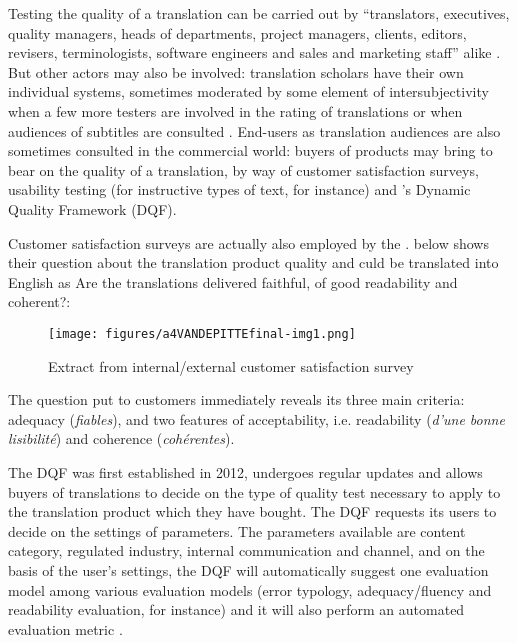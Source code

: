 \documentclass[output=paper]{langsci/langscibook}
\begin{document}
Testing the quality of a translation can be carried out by ``translators, executives, quality managers, heads of departments, project managers, clients, editors, revisers, terminologists, software engineers and sales and marketing staff'' alike \citep[3]{Drugan2013}. But other actors may also be involved: translation scholars have their own individual systems, sometimes moderated by some element of intersubjectivity when a few more testers are involved in the rating of translations or when audiences of subtitles are consulted \citep{Delia2014}. End-users as translation audiences are also sometimes consulted in the commercial world: buyers of products may bring to bear on the quality of a translation, by way of customer satisfaction surveys, usability testing (for instructive types of text, for instance) and \citeauthor{TAUS2015}'s Dynamic Quality Framework (DQF). 

Customer satisfaction surveys are actually also employed by the \citeauthor{SCTA2015}.  below shows their question about the translation product quality and culd be translated into English as Are the translations delivered faithful, of good readability and coherent?:

\begin{figure}
\caption{\label{fig:key:1} Extract from \citeauthor{SCTA2015} internal/external customer satisfaction survey \citep{SCTA2015}}
\texttt{[image: figures/a4VANDEPITTEfinal-img1.png]}
\end{figure}

  The question put to \citeauthor{SCTA2015} customers immediately reveals its three main criteria: adequacy (\textit{fiables}), and two features of acceptability, i.e. readability (\textit{d'une bonne lisibilité}) and coherence (\textit{cohérentes}). 

The \citeauthor{TAUS2017dashboard} DQF was first established in 2012, undergoes regular updates and allows buyers of translations to decide on the type of quality test necessary to apply to the translation product which they have bought. The DQF requests its users to decide on the settings of parameters. The parameters available are content category, regulated industry, internal communication and channel, and on the basis of the user's settings, the DQF will automatically suggest one evaluation model among various evaluation models (error typology, adequacy/fluency and readability evaluation, for instance) and it will also perform an automated evaluation metric \citep{TAUS2017dashboard}. 
\end{document}
